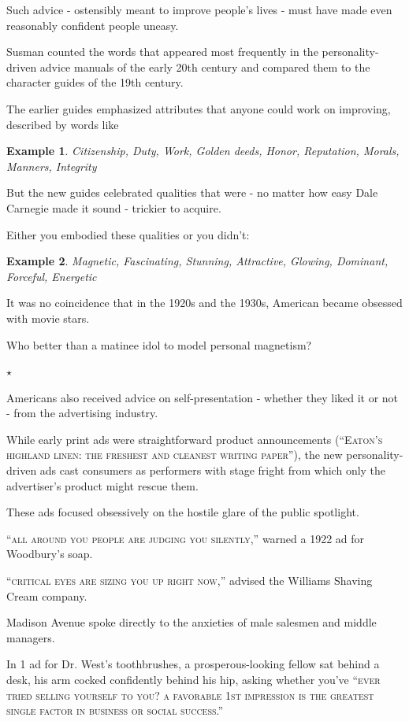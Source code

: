 \documentclass[oneside]{article}
\numberwithin{equation}{section}
\newtheorem{example}{Example}[section]
\begin{document}
%
Such advice - ostensibly meant to improve people's lives - must have made even reasonably confident people uneasy.

Susman counted the words that appeared most frequently in the personality-driven advice manuals of the early 20th century and compared them to the character guides of the 19th century.

The earlier guides emphasized attributes that anyone could work on improving, described by words like
\begin{example}
    Citizenship, Duty, Work, Golden deeds, Honor, Reputation, Morals, Manners, Integrity
\end{example}
%
But the new guides celebrated qualities that were - no matter how easy Dale Carnegie made it sound - trickier to acquire.

Either you embodied these qualities or you didn't:
\begin{example}
    Magnetic, Fascinating, Stunning, Attractive, Glowing, Dominant, Forceful, Energetic
\end{example}
%
It was no coincidence that in the 1920s and the 1930s, American became obsessed with movie stars.

Who better than a matinee idol to model personal magnetism?
\begin{center}
    $\star$
\end{center}
Americans also received advice on self-presentation - whether they liked it or not - from the advertising industry.

While early print ads were straightforward product announcements (``\textsc{Eaton's highland linen: the freshest and cleanest writing paper}''), the new personality-driven ads cast consumers as performers with stage fright from which only the advertiser's product might rescue them.

These ads focused obsessively on the hostile glare of the public spotlight.

``\textsc{all around you people are judging you silently},'' warned a 1922 ad for Woodbury's soap.

``\textsc{critical eyes are sizing you up right now},'' advised the Williams Shaving Cream company.

%
Madison Avenue spoke directly to the anxieties of male salesmen and middle managers.

In 1 ad for Dr. West's toothbrushes, a prosperous-looking fellow sat behind a desk, his arm cocked confidently behind his hip, asking whether you've ``\textsc{ever tried selling yourself to you? a favorable 1st impression is the greatest single factor in business or social success}.''
\end{document}
